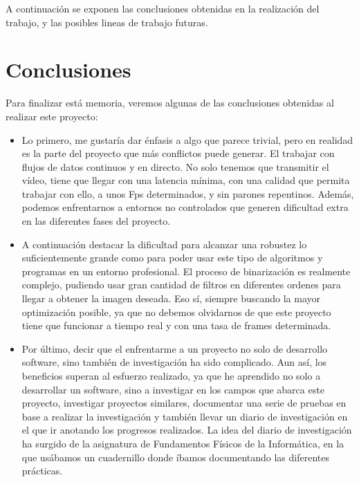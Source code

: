 A continuación se exponen las conclusiones obtenidas en la realización del trabajo, y las posibles lineas de trabajo futuras. 

\section{Conclusiones}
Para finalizar está memoria, veremos algunas de las conclusiones obtenidas al realizar este proyecto:

\begin{itemize}
	\item Lo primero, me gustaría dar énfasis a algo que parece trivial, pero en realidad es la parte del proyecto que más conflictos puede generar. El trabajar con flujos de datos continuos y en directo. No solo tenemos que transmitir el vídeo, tiene que llegar con una latencia mínima, con una calidad que permita trabajar con ello, a unos Fps determinados, y sin parones repentinos. Además, podemos enfrentarnos a entornos no controlados que generen dificultad extra en las diferentes fases del proyecto.
	
	\item A continuación destacar la dificultad para alcanzar una robustez lo suficientemente grande como para poder usar este tipo de algoritmos y programas en un entorno profesional. El proceso de binarización es realmente complejo, pudiendo usar gran cantidad de filtros en diferentes ordenes para llegar a obtener la imagen deseada. Eso sí, siempre buscando la mayor optimización posible, ya que no debemos olvidarnos de que este proyecto tiene que funcionar a tiempo real y con una tasa de frames determinada.
	
	\item Por último, decir que el enfrentarme a un proyecto no solo de desarrollo software, sino también de investigación ha sido complicado. Aun así, los beneficios superan al esfuerzo realizado, ya que he aprendido no solo a desarrollar un software, sino a investigar en los campos que abarca este proyecto, investigar proyectos similares, documentar una serie de pruebas en base a realizar la investigación y también llevar un diario de investigación en el que ir anotando los progresos realizados. La idea del diario de investigación ha surgido de la asignatura de Fundamentos Físicos de la Informática, en la que usábamos un cuadernillo donde íbamos documentando las diferentes prácticas.
	
\end{itemize}

